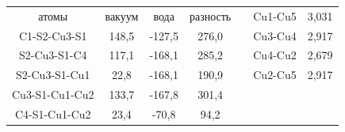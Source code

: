 \documentclass[a4paper,12pt]{article}
\begin{document}
\begin{onehalfspace}
\begin{table}[H]
\begin{tabular}{|cccc|ccc}
			\multicolumn{1}{|c|}{атомы}          & \multicolumn{1}{c|}{вакуум} & \multicolumn{1}{c|}{вода}   & разность & \multicolumn{1}{c|}{} & \multicolumn{1}{c|}{Cu1-Cu5} & \multicolumn{1}{c|}{3,031}                     \\ \cline{1-4} \cline{6-7} 
			\multicolumn{1}{|c|}{C1-S2-Cu3-S1}   & \multicolumn{1}{c|}{148,5}  & \multicolumn{1}{c|}{-127,5} & 276,0    & \multicolumn{1}{c|}{} & \multicolumn{1}{c|}{Cu3-Cu4} & \multicolumn{1}{c|}{2,917}                     \\ \cline{1-4} \cline{6-7} 
			\multicolumn{1}{|c|}{S2-Cu3-S1-C4}   & \multicolumn{1}{c|}{117,1}  & \multicolumn{1}{c|}{-168,1} & 285,2    & \multicolumn{1}{c|}{} & \multicolumn{1}{c|}{Cu4-Cu2} & \multicolumn{1}{c|}{2,679}                     \\ \cline{1-4} \cline{6-7} 
			\multicolumn{1}{|c|}{S2-Cu3-S1-Cu1}  & \multicolumn{1}{c|}{22,8}   & \multicolumn{1}{c|}{-168,1} & 190,9    & \multicolumn{1}{c|}{} & \multicolumn{1}{c|}{Cu2-Cu5} & \multicolumn{1}{c|}{2,917}                     \\ \cline{1-4} \cline{6-7} 
			\multicolumn{1}{|c|}{Cu3-S1-Cu1-Cu2} & \multicolumn{1}{c|}{133,7}  & \multicolumn{1}{c|}{-167,8} & 301,4    &                       &                              &                                                \\ \cline{1-4}
			\multicolumn{1}{|c|}{C4-S1-Cu1-Cu2}  & \multicolumn{1}{c|}{23,4}   & \multicolumn{1}{c|}{-70,8}  & 94,2     &                       &                              & \textit{}                                      \\ \cline{1-4}
		\end{tabular}
	\end{table}


\end{onehalfspace}
\end{document}
